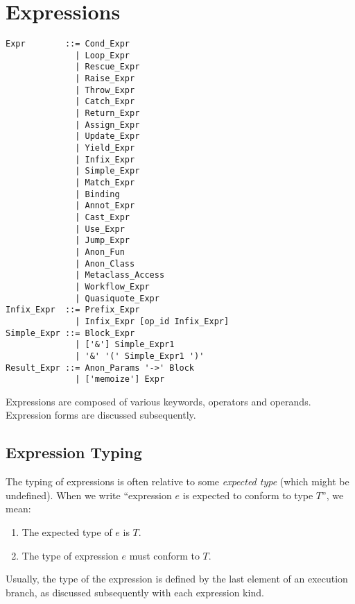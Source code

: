 
\chapter{Expressions}


\syntax\begin{lstlisting}
Expr        ::= Cond_Expr
              | Loop_Expr
              | Rescue_Expr
              | Raise_Expr
              | Throw_Expr
              | Catch_Expr
              | Return_Expr
              | Assign_Expr
              | Update_Expr
              | Yield_Expr
              | Infix_Expr
              | Simple_Expr
              | Match_Expr
              | Binding
              | Annot_Expr
              | Cast_Expr
              | Use_Expr
              | Jump_Expr
              | Anon_Fun
              | Anon_Class
              | Metaclass_Access
              | Workflow_Expr
              | Quasiquote_Expr
Infix_Expr  ::= Prefix_Expr
              | Infix_Expr [op_id Infix_Expr]
Simple_Expr ::= Block_Expr
              | ['&'] Simple_Expr1
              | '&' '(' Simple_Expr1 ')'
Result_Expr ::= Anon_Params '->' Block 
              | ['memoize'] Expr
\end{lstlisting}

Expressions are composed of various keywords, operators and operands. Expression forms are discussed subsequently. 







\section{Expression Typing}

The typing of expressions is often relative to some {\em expected type} (which might be undefined). When we write ``expression $e$ is expected to conform to type $T$'', we mean:
\begin{enumerate}
\item The expected type of $e$ is $T$.
\item The type of expression $e$ must conform to $T$. 
\end{enumerate}

Usually, the type of the expression is defined by the last element of an execution branch, as discussed subsequently with each expression kind. 

